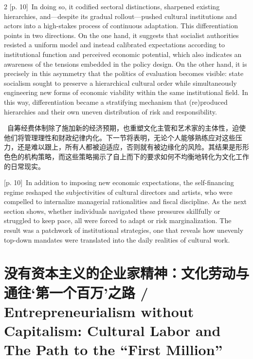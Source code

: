 \documentclass[10pt,a4paper]{article}
\begin{document}
\begin{paracol}{2}
\switchcolumn
{\scriptsize\color{gray} [p. 10]}\ In doing so, it codified sectoral distinctions, sharpened existing hierarchies, and—despite its gradual rollout—pushed cultural institutions and actors into a high-stakes process of continuous adaptation. This differentiation points in two directions. On the one hand, it suggests that socialist authorities resisted a uniform model and instead calibrated expectations according to institutional function and perceived economic potential, which also indicates an awareness of the tensions embedded in the policy design. On the other hand, it is precisely in this asymmetry that the politics of evaluation becomes visible: state socialism sought to preserve a hierarchical cultural order while simultaneously engineering new forms of economic viability within the same institutional field. In this way, differentiation became a stratifying mechanism that (re)produced hierarchies and their own uneven distribution of risk and responsibility.\par
\switchcolumn*
{\scriptsize\color{gray} [p. 10]}\ 自筹经费体制除了施加新的经济预期，也重塑文化主管和艺术家的主体性，迫使他们将管理理性和财政纪律内化。下一节将表明，无论个人能够熟练应对这些压力，还是难以跟上，所有人都被迫适应，否则就有被边缘化的风险。其结果是形形色色的机构策略，而这些策略揭示了自上而下的要求如何不均衡地转化为文化工作的日常现实。\par
\switchcolumn
{\scriptsize\color{gray} [p. 10]}\ In addition to imposing new economic expectations, the self-financing regime reshaped the subjectivities of cultural directors and artists, who were compelled to internalize managerial rationalities and fiscal discipline. As the next section shows, whether individuals navigated these pressures skillfully or struggled to keep pace, all were forced to adapt or risk marginalization. The result was a patchwork of institutional strategies, one that reveals how unevenly top-down mandates were translated into the daily realities of cultural work.\par
\switchcolumn*
\end{paracol}
\section*{没有资本主义的企业家精神：文化劳动与通往‘第一个百万’之路 / Entrepreneurialism without Capitalism: Cultural Labor and The Path to the “First Million”}
\end{document}
